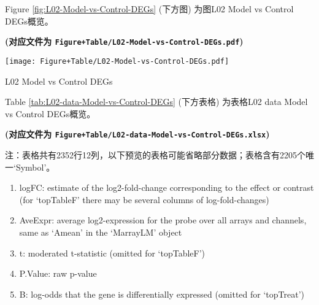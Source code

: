 \documentclass[
]{article}
\providecommand{\tightlist}{%
  \setlength{\itemsep}{0pt}\setlength{\parskip}{0pt}}
\begin{document}
Figure \ref{fig:L02-Model-vs-Control-DEGs} (下方图) 为图L02 Model vs Control DEGs概览。

\textbf{(对应文件为 \texttt{Figure+Table/L02-Model-vs-Control-DEGs.pdf})}

\def\@captype{figure}
\begin{center}
\texttt{[image: Figure+Table/L02-Model-vs-Control-DEGs.pdf]}
\caption{L02 Model vs Control DEGs}\label{fig:L02-Model-vs-Control-DEGs}
\end{center}

Table \ref{tab:L02-data-Model-vs-Control-DEGs} (下方表格) 为表格L02 data Model vs Control DEGs概览。

\textbf{(对应文件为 \texttt{Figure+Table/L02-data-Model-vs-Control-DEGs.xlsx})}

\begin{center}\begin{tcolorbox}[colback=gray!10, colframe=gray!50, width=0.9\linewidth, arc=1mm, boxrule=0.5pt]注：表格共有2352行12列，以下预览的表格可能省略部分数据；表格含有2205个唯一`Symbol'。
\end{tcolorbox}
\end{center}
\begin{center}\begin{tcolorbox}[colback=gray!10, colframe=gray!50, width=0.9\linewidth, arc=1mm, boxrule=0.5pt]\begin{enumerate}\tightlist
\item logFC:  estimate of the log2-fold-change corresponding to the effect or contrast (for ‘topTableF’ there may be several columns of log-fold-changes)
\item AveExpr:  average log2-expression for the probe over all arrays and channels, same as ‘Amean’ in the ‘MarrayLM’ object
\item t:  moderated t-statistic (omitted for ‘topTableF’)
\item P.Value:  raw p-value
\item B:  log-odds that the gene is differentially expressed (omitted for ‘topTreat’)
\end{enumerate}\end{tcolorbox}
\end{center}
\end{document}
